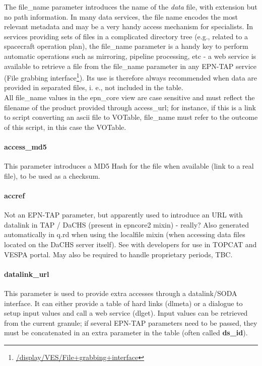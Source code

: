 \documentclass[11pt,a4paper]{ivoa}
\begin{document}
The file\_name parameter introduces the name of the \emph{data} file, with extension but no path information. In many data services, the file name encodes the most relevant metadata and may be a very handy access mechanism for specialists. In services providing sets of files in a complicated directory tree (e.g., related to a spacecraft operation plan), the file\_name parameter is a handy key to perform automatic operations such as mirroring, pipeline processing, etc - a web service is available to retrieve a file from the file\_name parameter in any EPN-TAP service (File grabbing interface\footnote{\url{/display/VES/File+grabbing+interface}}). Its use is therefore always recommended when data are provided in separated files, i. e., not included in the table.\\All file\_name values in the epn\_core view are case sensitive and must reflect the filename of the product provided through access\_url; for instance, if this is a link to script converting an ascii file to VOTable, file\_name must refer to the outcome of this script, in this case the VOTable.

\paragraph{access\_md5}

This parameter introduces a MD5 Hash for the file when available (link to a real file), to be used as a checksum.\\

\paragraph{accref}

Not an EPN-TAP parameter, but apparently used to introduce an URL with datalink in TAP / DaCHS (present in epncore2 mixin) - really? Also generated automatically in q.rd when using the localfile mixin (when accessing data files located on the DaCHS server itself). See with developers for use in TOPCAT and VESPA portal. May also be required to handle proprietary periods, TBC. \\

\paragraph{datalink\_url}

This parameter is used to provide extra accesses through a datalink/SODA interface. It can either provide a table of hard links (dlmeta) or a dialogue to setup input values and call a web service (dlget). Input values can be retrieved from the current granule; if several EPN-TAP parameters need to be passed, they must be concatenated in an extra parameter in the table (often called \textbf{ds\_id}).
\end{document}
